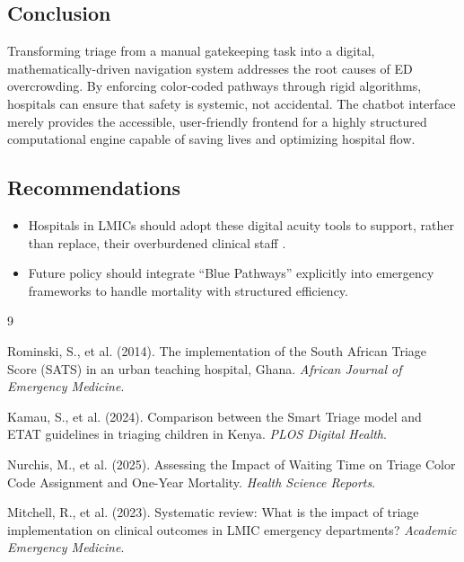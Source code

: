 \documentclass[12pt, a4paper]{article}
\begin{document}
	\subsection*{Conclusion}
	Transforming triage from a manual gatekeeping task into a digital, mathematically-driven navigation system addresses the root causes of ED overcrowding. By enforcing color-coded pathways through rigid algorithms, hospitals can ensure that safety is systemic, not accidental. The chatbot interface merely provides the accessible, user-friendly frontend for a highly structured computational engine capable of saving lives and optimizing hospital flow.
	
	\subsection*{Recommendations}
	\begin{itemize}
		\item Hospitals in LMICs should adopt these digital acuity tools to support, rather than replace, their overburdened clinical staff \cite{kamau2024}.
		\item Future policy should integrate ``Blue Pathways'' explicitly into emergency frameworks to handle mortality with structured efficiency.
	\end{itemize}
	
	\begin{thebibliography}{9}
		
		Rominski, S., et al. (2014). The implementation of the South African Triage Score (SATS) in an urban teaching hospital, Ghana. \textit{African Journal of Emergency Medicine}.
		
		Kamau, S., et al. (2024). Comparison between the Smart Triage model and ETAT guidelines in triaging children in Kenya. \textit{PLOS Digital Health}.
		
		Nurchis, M., et al. (2025). Assessing the Impact of Waiting Time on Triage Color Code Assignment and One-Year Mortality. \textit{Health Science Reports}.
		
		Mitchell, R., et al. (2023). Systematic review: What is the impact of triage implementation on clinical outcomes in LMIC emergency departments? \textit{Academic Emergency Medicine}.
		
	\end{thebibliography}
	
\end{document}
